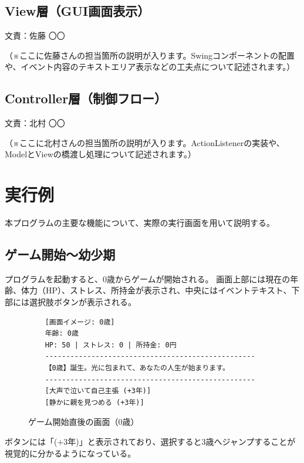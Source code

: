 \documentclass[a4paper,11pt]{jsarticle}
\begin{document}
\subsection{View層（GUI画面表示）}
\begin{flushright}
文責：佐藤 〇〇
\end{flushright}
（※ここに佐藤さんの担当箇所の説明が入ります。Swingコンポーネントの配置や、イベント内容のテキストエリア表示などの工夫点について記述されます。）

\subsection{Controller層（制御フロー）}
\begin{flushright}
文責：北村 〇〇
\end{flushright}
（※ここに北村さんの担当箇所の説明が入ります。ActionListenerの実装や、ModelとViewの橋渡し処理について記述されます。）

\section{実行例}
本プログラムの主要な機能について、実際の実行画面を用いて説明する。

\subsection{ゲーム開始〜幼少期}
プログラムを起動すると、0歳からゲームが開始される。
画面上部には現在の年齢、体力（HP）、ストレス、所持金が表示され、中央にはイベントテキスト、下部には選択肢ボタンが表示される。

\begin{figure}[H]
    \centering
    \begin{verbatim}
    [画面イメージ: 0歳]
    年齢: 0歳
    HP: 50 | ストレス: 0 | 所持金: 0円
    --------------------------------------------------
    【0歳】誕生。光に包まれて、あなたの人生が始まります。
    --------------------------------------------------
    [大声で泣いて自己主張 (+3年)]
    [静かに親を見つめる (+3年)]
    \end{verbatim}
    \caption{ゲーム開始直後の画面（0歳）}
\end{figure}

ボタンには「(+3年)」と表示されており、選択すると3歳へジャンプすることが視覚的に分かるようになっている。
\end{document}
